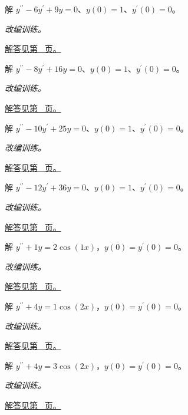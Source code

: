 \documentclass[UTF8,12pt,a4paper,fontset=fandol]{ctexart}
\begin{document}
\begin{example}[重复特征根]\label{ex:c23q15}
解 $y^{\prime\prime}-6y^{\prime}+9y=0$、$y(0)=1$、$y^{\prime}(0)=0$。
\par\textit{改编训练。}\par\hyperref[ans:c23q15]{解答见第~\pageref{ans:c23q15} 页。}
\end{example}
\begin{example}[重复特征根]\label{ex:c23q16}
解 $y^{\prime\prime}-8y^{\prime}+16y=0$、$y(0)=1$、$y^{\prime}(0)=0$。
\par\textit{改编训练。}\par\hyperref[ans:c23q16]{解答见第~\pageref{ans:c23q16} 页。}
\end{example}
\begin{example}[重复特征根]\label{ex:c23q17}
解 $y^{\prime\prime}-10y^{\prime}+25y=0$、$y(0)=1$、$y^{\prime}(0)=0$。
\par\textit{改编训练。}\par\hyperref[ans:c23q17]{解答见第~\pageref{ans:c23q17} 页。}
\end{example}
\begin{example}[重复特征根]\label{ex:c23q18}
解 $y^{\prime\prime}-12y^{\prime}+36y=0$、$y(0)=1$、$y^{\prime}(0)=0$。
\par\textit{改编训练。}\par\hyperref[ans:c23q18]{解答见第~\pageref{ans:c23q18} 页。}
\end{example}
\begin{example}[共振强迫振动]\label{ex:c23q19}
解 $y^{\prime\prime}+1y=2\cos(1x)$，$y(0)=y^{\prime}(0)=0$。
\par\textit{改编训练。}\par\hyperref[ans:c23q19]{解答见第~\pageref{ans:c23q19} 页。}
\end{example}
\begin{example}[共振强迫振动]\label{ex:c23q20}
解 $y^{\prime\prime}+4y=1\cos(2x)$，$y(0)=y^{\prime}(0)=0$。
\par\textit{改编训练。}\par\hyperref[ans:c23q20]{解答见第~\pageref{ans:c23q20} 页。}
\end{example}
\begin{example}[共振强迫振动]\label{ex:c23q21}
解 $y^{\prime\prime}+4y=3\cos(2x)$，$y(0)=y^{\prime}(0)=0$。
\par\textit{改编训练。}\par\hyperref[ans:c23q21]{解答见第~\pageref{ans:c23q21} 页。}
\end{example}
\end{document}

